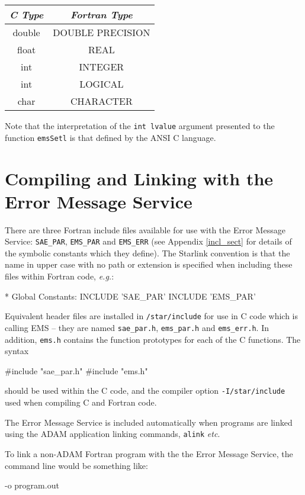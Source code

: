 \documentclass[twoside,11pt]{starlink}
\begin{document}
\begin {center}
\begin {tabular}{||c|c||}
\hline
\textit{C Type} & \textit{Fortran Type}\\
\hline
double & DOUBLE PRECISION\\
float & REAL\\
int & INTEGER\\
int & LOGICAL\\
char & CHARACTER\\
\hline
\end {tabular}
\end {center}

Note that the interpretation of the \texttt{int lvalue} argument presented to
the function \texttt{emsSetl} is that defined by the ANSI C language.

\section{Compiling
and Linking with the Error Message Service}\label{comp_sect}

There are three Fortran include files available for use with the Error Message
Service: \texttt{SAE\_PAR}, \texttt{EMS\_PAR} and \texttt{EMS\_ERR}
(see Appendix \ref{incl_sect} for details of the symbolic constants which they
define).
The Starlink convention is that the name in upper case with no path or
extension is specified when including these files within Fortran code,
\textit{e.g.}:
\begin{terminalv}
*  Global Constants:
      INCLUDE 'SAE_PAR'
      INCLUDE 'EMS_PAR'
\end{terminalv}
Equivalent header files are installed in \texttt{/star/include} for use in C
code which is calling EMS -- they are named \texttt{sae\_par.h},
\texttt{ems\_par.h} and \texttt{ems\_err.h}.
In addition, \texttt{ems.h} contains the function prototypes for each of the C
functions.
The syntax
\begin{terminalv}
#include "sae_par.h"
#include "ems.h"
\end{terminalv}
should be used within the C code, and the compiler option
\texttt{-I/star/include} used when compiling C and Fortran code.

The Error Message Service is included automatically when
programs are linked using the ADAM application linking commands,
\texttt{alink} \textit{etc}.

To link a non-ADAM Fortran program with the the Error Message Service, the
command line would be something like:
\begin{terminalv}
      -o program.out
\end{terminalv}
\end{document}
